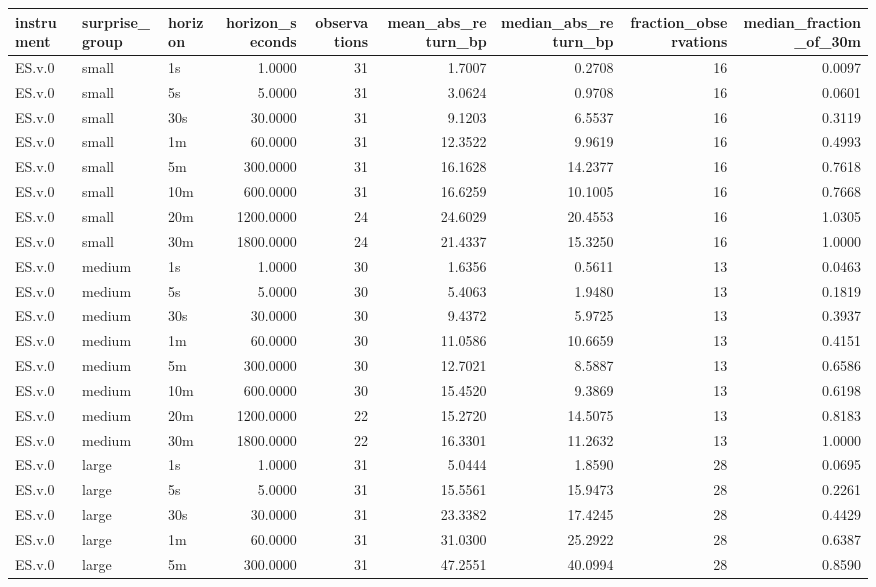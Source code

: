 \begin{tabular}{lllrrrrrr}
\toprule
instrument & surprise_group & horizon & horizon_seconds & observations & mean_abs_return_bp & median_abs_return_bp & fraction_observations & median_fraction_of_30m \\
\midrule
ES.v.0 & small & 1s & 1.0000 & 31 & 1.7007 & 0.2708 & 16 & 0.0097 \\
ES.v.0 & small & 5s & 5.0000 & 31 & 3.0624 & 0.9708 & 16 & 0.0601 \\
ES.v.0 & small & 30s & 30.0000 & 31 & 9.1203 & 6.5537 & 16 & 0.3119 \\
ES.v.0 & small & 1m & 60.0000 & 31 & 12.3522 & 9.9619 & 16 & 0.4993 \\
ES.v.0 & small & 5m & 300.0000 & 31 & 16.1628 & 14.2377 & 16 & 0.7618 \\
ES.v.0 & small & 10m & 600.0000 & 31 & 16.6259 & 10.1005 & 16 & 0.7668 \\
ES.v.0 & small & 20m & 1200.0000 & 24 & 24.6029 & 20.4553 & 16 & 1.0305 \\
ES.v.0 & small & 30m & 1800.0000 & 24 & 21.4337 & 15.3250 & 16 & 1.0000 \\
ES.v.0 & medium & 1s & 1.0000 & 30 & 1.6356 & 0.5611 & 13 & 0.0463 \\
ES.v.0 & medium & 5s & 5.0000 & 30 & 5.4063 & 1.9480 & 13 & 0.1819 \\
ES.v.0 & medium & 30s & 30.0000 & 30 & 9.4372 & 5.9725 & 13 & 0.3937 \\
ES.v.0 & medium & 1m & 60.0000 & 30 & 11.0586 & 10.6659 & 13 & 0.4151 \\
ES.v.0 & medium & 5m & 300.0000 & 30 & 12.7021 & 8.5887 & 13 & 0.6586 \\
ES.v.0 & medium & 10m & 600.0000 & 30 & 15.4520 & 9.3869 & 13 & 0.6198 \\
ES.v.0 & medium & 20m & 1200.0000 & 22 & 15.2720 & 14.5075 & 13 & 0.8183 \\
ES.v.0 & medium & 30m & 1800.0000 & 22 & 16.3301 & 11.2632 & 13 & 1.0000 \\
ES.v.0 & large & 1s & 1.0000 & 31 & 5.0444 & 1.8590 & 28 & 0.0695 \\
ES.v.0 & large & 5s & 5.0000 & 31 & 15.5561 & 15.9473 & 28 & 0.2261 \\
ES.v.0 & large & 30s & 30.0000 & 31 & 23.3382 & 17.4245 & 28 & 0.4429 \\
ES.v.0 & large & 1m & 60.0000 & 31 & 31.0300 & 25.2922 & 28 & 0.6387 \\
ES.v.0 & large & 5m & 300.0000 & 31 & 47.2551 & 40.0994 & 28 & 0.8590 \\

\end{tabular}

